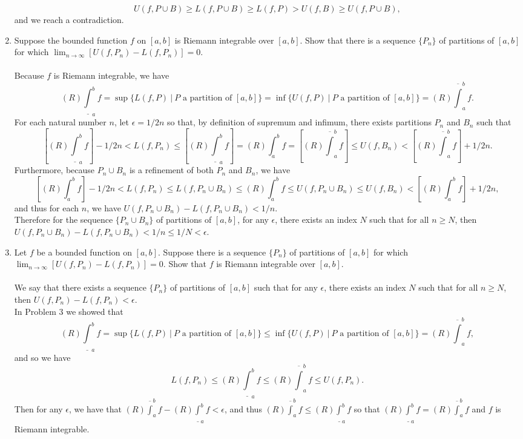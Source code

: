 \begin{enumerate}
    \[
        U(f,P\cup B)\ge L(f,P\cup B)\ge L(f,P)>U(f,B)\ge U(f,P\cup B),
    \]
    and we reach a contradiction.
    \item Suppose the bounded function $f$ on $[a,b]$ is Riemann integrable over $[a,b]$.
    Show that there is a sequence $\{P_n\}$ of partitions of $[a,b]$ for which $\lim_{n\to\infty}[U(f,P_n)-L(f,P_n)]=0$.\\
    \\Because $f$ is Riemann integrable, we have
    \[
        (R)\underline\int_a^bf=\sup\biggl\{L(f,P)\ |\ P\text{ a partition of }[a,b]\biggr\}=\inf\biggl\{U(f,P)\ |\ P\text{ a partition of }[a,b]\biggr\}=(R)\overline\int_a^bf.
    \]
    For each natural number $n$, let $\epsilon=1/2n$ so that, by definition of supremum and infimum, there exists partitions $P_n$ and $B_n$ such that 
    \[
        \left[(R)\underline\int_a^bf\right]-1/2n<L(f,P_n) \le\left[(R)\underline\int_a^bf\right]=(R)\int_a^bf=\left[(R)\overline\int_a^bf\right]\le U(f,B_n)<\left[(R)\overline\int_a^bf\right]+1/2n.
    \]
    Furthermore, because $P_n\cup B_n$ is a refinement of both $P_n$ and $B_n$, we have
    \[
        \left[(R)\int_a^bf\right]-1/2n<L(f,P_n)\le L(f,P_n\cup B_n) \le(R)\int_a^bf\le U(f,P_n\cup B_n)\le U(f,B_n)<\left[(R)\int_a^bf\right]+1/2n,
    \]
    and thus for each $n$, we have $U(f,P_n\cup B_n)-L(f,P_n\cup B_n)<1/n$.
    \\Therefore for the sequence $\{P_n\cup B_n\}$ of partitions of $[a,b]$, for any $\epsilon$, there exists an index $N$ such that for all $n\ge N$, then $U(f,P_n\cup B_n)-L(f,P_n\cup B_n)<1/n\le 1/N<\epsilon$.
    \item Let $f$ be a bounded function on $[a,b]$. Suppose there is a sequence $\{P_n\}$ of partitions of $[a,b]$ for which $\lim_{n\to\infty}[U(f,P_n)-L(f,P_n)]=0$. Show that $f$ is Riemann integrable over $[a,b]$.\\
    \\We say that there exists a sequence $\{P_n\}$ of partitions of $[a,b]$ such that for any $\epsilon$, there exists an index $N$ such that for all $n\ge N$, then $U(f,P_n)-L(f,P_n)<\epsilon$.
    \\In Problem 3 we showed that 
    \[
        (R)\underline\int_a^bf=\sup\biggl\{L(f,P)\ |\ P\text{ a partition of }[a,b]\biggr\}\le \inf\biggl\{U(f,P)\ |\ P\text{ a partition of }[a,b]\biggr\}=(R)\overline\int_a^bf,
    \]
    and so we have
    \[
        L(f,P_n)\le (R)\underline\int_a^bf\le (R)\overline\int_a^bf\le U(f,P_n).
    \]
    Then for any $\epsilon$, we have that $(R)\overline\int_a^bf-(R)\underline\int_a^bf<\epsilon$, and thus $(R)\overline\int_a^bf\le(R)\underline\int_a^bf$ so that $(R)\underline\int_a^bf=(R)\overline\int_a^bf$ and $f$ is Riemann integrable.

\end{enumerate}
